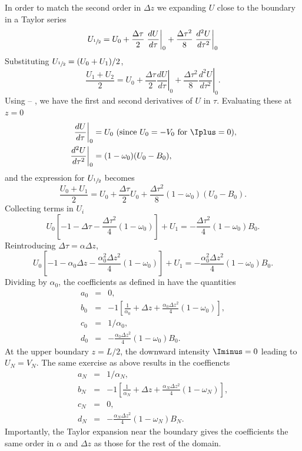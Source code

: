 In order to match the second order in $\Delta z$ we expanding $U$ close to the boundary in a Taylor series
\begin{equation}
    U_{\sfrac{1}{2}} = U_0 + \frac{\Delta \tau}{2} \left. \frac{dU}{d\tau} \right|_0 + \frac{\Delta \tau^2}{8} \left. \frac{d^2U}{d\tau^2}\right|_0
\end{equation}
Substituting $U_{\sfrac{1}{2}} = (U_0 + U_1)/2$,
\begin{equation}
    \frac{U_1 + U_2}{2} = U_0 + \frac{\Delta \tau}{2} \left. \frac{dU}{d\tau} \right|_0 + \frac{\Delta \tau^2}{8} \left. \frac{d^2U}{d\tau^2}\right|_0.
\end{equation}
Using  -- , we have the first and second derivatives of $U$ in $\tau$. Evaluating these at $z=0$
\begin{align}
    \left. \frac{dU}{d\tau} \right|_0 &= U_0 \text{  (since}\ U_0=-V_0 \text{ for } \Iplus=0), \\
    \left. \frac{d^2U}{d\tau^2}\right|_0 &= (1-\omega_0)(U_0-B_0),
\end{align}
and the expression for $U_{\sfrac{1}{2}}$ becomes
\begin{equation}
    \frac{U_0 + U_1}{2} = U_0 + \frac{\Delta \tau}{2} U_0 + \frac{\Delta \tau^2}{8} (1-\omega_0)(U_0-B_0).
\end{equation}
Collecting terms in $U_i$
\begin{equation}
    U_0 \left[ -1-\Delta \tau - \frac{\Delta \tau^2}{4}(1-\omega_0) \right] + U_1 = - \frac{\Delta \tau^2}{4}(1-\omega_0)B_0.
\end{equation}
Reintroducing $\Delta \tau =\alpha \Delta z$,
\begin{equation}
    U_0 \left[ -1-\alpha_0\Delta z - \frac{\alpha_0^2\Delta z^2}{4}(1-\omega_0) \right] + U_1 = - \frac{\alpha_0^2\Delta z^2}{4}(1-\omega_0)B_0.
\end{equation}
Dividing by $\alpha_0$, the coefficients as defined in  have the quantities
\begin{eqnarray}
    a_0 &=& 0, \\
    b_0 &=& -1\left[ \frac{1}{\alpha_0} + \Delta z + \frac{\alpha_0 \Delta z^2}{4}(1-\omega_0) \right], \\
    c_0 &=& 1/\alpha_{0}, \\
    d_0 &=& - \frac{\alpha_0 \Delta z^2}{4}(1-\omega_0) B_0.
\end{eqnarray}
At the upper boundary $z=L/2$, the downward intensity $\Iminus=0$ leading to $U_N=V_N$. The same exercise as above results in the coeffiencts
\begin{eqnarray}
    a_N &=& 1/\alpha_N, \\
    b_N &=& -1\left[ \frac{1}{\alpha_N} + \Delta z + \frac{\alpha_N \Delta z^2}{4}(1-\omega_N) \right], \\
    c_N &=& 0, \\
    d_N &=& - \frac{\alpha_N \Delta z^2}{4}(1-\omega_N) B_N.
\end{eqnarray}
Importantly, the Taylor expansion near the boundary gives the coefficients the same order in $\alpha$ and $\Delta z$ as those for the rest of the domain.

